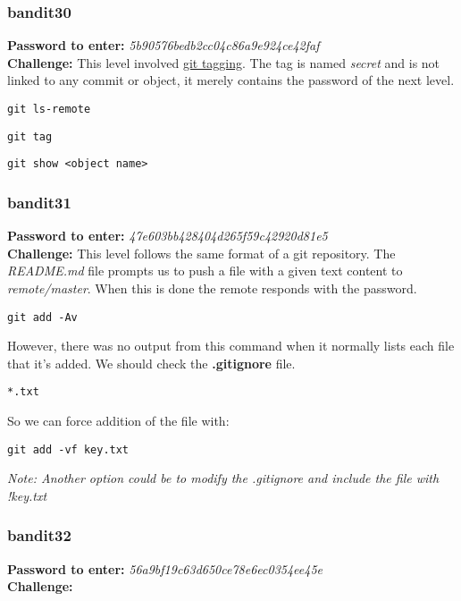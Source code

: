 \documentclass[a4paper]{article}
\newcommand{\pass}[1]{\textbf{Password to enter:} \textit{#1}\\}
\newcommand{\chall}{\textbf{Challenge:} }
\begin{document}
\subsubsection{bandit30}
\pass{5b90576bedb2cc04c86a9e924ce42faf}
\chall This level involved \href{https://git-scm.com/book/en/v2/Git-Basics-Tagging}{git tagging}. The tag is named \textit{secret} and is not linked to any commit or object, it merely contains the password of the next level.
\begin{lstlisting}[title=show all objects on the remote,deletekeywords={ls}]
git ls-remote
\end{lstlisting}
\begin{lstlisting}[title=show all local tags]
git tag
\end{lstlisting}
\begin{lstlisting}[title=show more information about a given object]
git show <object name>
\end{lstlisting}

\subsubsection{bandit31}
\pass{47e603bb428404d265f59c42920d81e5}
\chall This level follows the same format of a git repository. The \textit{README.md} file prompts us to push a file with a given text content to \textit{remote/master}. When this is done the remote responds with the password.
\begin{lstlisting}[title=my default way to add files to the index]
git add -Av
\end{lstlisting}
However, there was no output from this command when it normally lists each file that it's added. We should check the \textbf{.gitignore} file.
\begin{lstlisting}[title=contents of this specific .gitignore]
*.txt
\end{lstlisting}
So we can force addition of the file with:
\begin{lstlisting}
git add -vf key.txt
\end{lstlisting}
\textit{Note: Another option could be to modify the \textit{.gitignore} and include the file with \textit{!key.txt}}


\subsubsection{bandit32}
\pass{56a9bf19c63d650ce78e6ec0354ee45e}
\chall
\begin{lstlisting}
\end{lstlisting}
\end{document}
